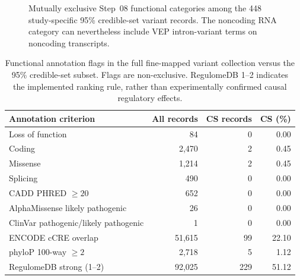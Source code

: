 \documentclass[11pt,a4paper]{article}
\begin{document}
\begin{figure}[htbp]
\centering
{}
\caption{Mutually exclusive Step~08 functional categories
among the 448 study-specific 95\% credible-set variant
records. The noncoding RNA category can nevertheless
include VEP intron-variant terms on noncoding transcripts.}
\label{fig:step08_consequence_bar}
\end{figure}

\begin{table}[htbp]
\centering
\small
\caption{Functional annotation flags in the full
fine-mapped variant collection versus the 95\% credible-set
subset. Flags are non-exclusive. RegulomeDB 1--2 indicates
the implemented ranking rule, rather than experimentally
confirmed causal regulatory effects.}
\label{tab:step08_evidence}
\begin{tabular}{@{}lrrr@{}}
\toprule
Annotation criterion & All records & CS records & CS (\%) \\
\midrule
Loss of function & 84 & 0 & 0.00 \\
Coding & 2,470 & 2 & 0.45 \\
Missense & 1,214 & 2 & 0.45 \\
Splicing & 490 & 0 & 0.00 \\
CADD PHRED $\geq20$ & 652 & 0 & 0.00 \\
AlphaMissense likely pathogenic & 26 & 0 & 0.00 \\
ClinVar pathogenic/likely pathogenic & 1 & 0 & 0.00 \\
ENCODE cCRE overlap & 51,615 & 99 & 22.10 \\
phyloP 100-way $\geq2$ & 2,718 & 5 & 1.12 \\
RegulomeDB strong (1--2) & 92,025 & 229 & 51.12 \\
\bottomrule
\end{tabular}
\end{table}
\end{document}
